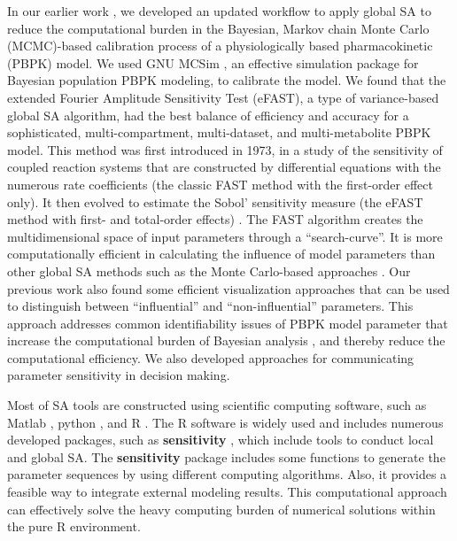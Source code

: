 \documentclass[preprint,12pt, a4paper]{elsarticle}
\begin{document}
In our earlier work \cite{fphar201800588}, we developed an updated workflow to apply global SA to reduce the computational burden in the Bayesian, Markov chain Monte Carlo (MCMC)-based calibration process of a physiologically based pharmacokinetic (PBPK) model. We used GNU MCSim \cite{bois2009gnu}, an effective simulation package for Bayesian population PBPK modeling, to calibrate the model. We found that the extended Fourier Amplitude Sensitivity Test (eFAST), a type of variance-based global SA algorithm, had the best balance of efficiency and accuracy for a sophisticated, multi-compartment, multi-dataset, and multi-metabolite PBPK model. This method was first introduced in 1973,  \cite{cukier1973study} in a study of the sensitivity of coupled reaction systems that are constructed by differential equations with the numerous rate coefficients (the classic FAST method with the first-order effect only). It then evolved to estimate the Sobol' sensitivity measure (the eFAST method with first- and total-order effects) \cite{saltelli1999quantitative}. The FAST algorithm creates the multidimensional space of input parameters through a ``search-curve''. It is more computationally efficient in calculating the influence of model parameters than other global SA methods such as the Monte Carlo-based approaches \cite{jansen1999analysis, owen2013better}. Our previous work also found some efficient visualization approaches that can be used to distinguish between ``influential'' and ``non-influential'' parameters. This approach addresses common identifiability issues of PBPK model parameter that increase the computational burden of Bayesian analysis \cite{garcia2015identifiability}, and thereby reduce the computational efficiency. We also developed approaches for communicating parameter sensitivity in decision making.

Most of SA tools are constructed using scientific computing software, 
such as Matlab \cite{pianosi2015matlab}, python \cite{herman2017salib}, and R \cite{iooss2017introduction}. The R software is widely used and includes numerous developed packages, such as \textbf{sensitivity} \cite{R-sensitivity}, which include tools to conduct local and global SA. The \textbf{sensitivity} package includes some functions to generate the parameter sequences by using different computing algorithms. Also, it provides a feasible way to integrate external modeling results. This computational approach can effectively solve the heavy computing burden of numerical solutions within the pure R environment. 
\end{document}
